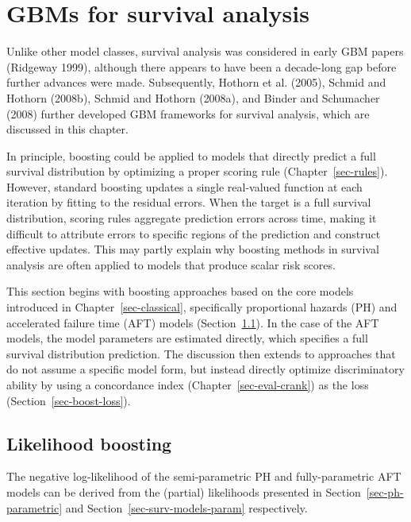 \documentclass[
  letterpaper,
  krantz2]{style/krantz}
\begin{document}
\section{GBMs for survival
analysis}\label{sec-surv-ml-models-boost-surv}

Unlike other model classes, survival analysis was considered in early
GBM papers (Ridgeway 1999), although there appears to have been a
decade-long gap before further advances were made. Subsequently, Hothorn
et al. (2005), Schmid and Hothorn (2008b), Schmid and Hothorn (2008a),
and Binder and Schumacher (2008) further developed GBM frameworks for
survival analysis, which are discussed in this chapter.

In principle, boosting could be applied to models that directly predict
a full survival distribution by optimizing a proper scoring rule
(Chapter~\ref{sec-rules}). However, standard boosting updates a single
real-valued function at each iteration by fitting to the residual
errors. When the target is a full survival distribution, scoring rules
aggregate prediction errors across time, making it difficult to
attribute errors to specific regions of the prediction and construct
effective updates. This may partly explain why boosting methods in
survival analysis are often applied to models that produce scalar risk
scores.

This section begins with boosting approaches based on the core models
introduced in Chapter~\ref{sec-classical}, specifically proportional
hazards (PH) and accelerated failure time (AFT) models
(Section~\ref{sec-boost-likelihood}).
 In the case
of the AFT models, the model parameters are estimated directly, which
specifies a full survival distribution prediction. The discussion then
extends to approaches that do not assume a specific model form, but
instead directly optimize discriminatory ability by using a concordance
index (Chapter~\ref{sec-eval-crank}) as the loss
(Section~\ref{sec-boost-loss}).

\subsection{Likelihood boosting}\label{sec-boost-likelihood}

The negative log-likelihood of the semi-parametric PH and
fully-parametric AFT models can be derived from the (partial)
likelihoods presented in Section~\ref{sec-ph-parametric} and
Section~\ref{sec-surv-models-param} respectively.
\end{document}
